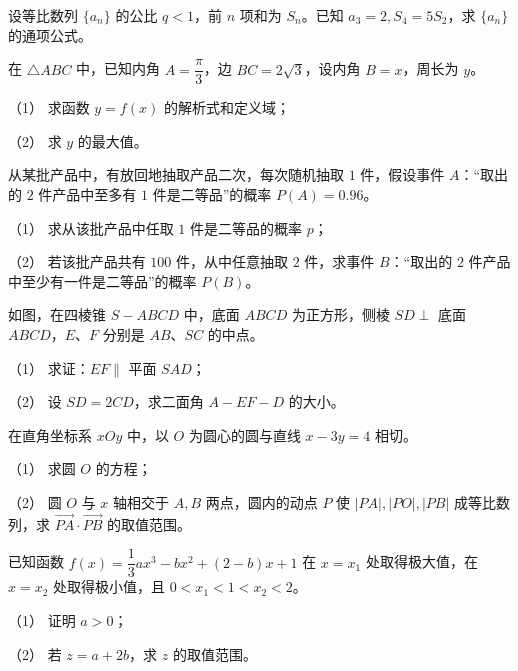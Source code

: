 \begin{question}
设等比数列 $\{a_n\}$ 的公比 $q<1$，前 $n$ 项和为 $S_n$。已知 $a_3=2,S_4=5S_2$，求 $\{a_n\}$ 的通项公式。

\end{question}
\begin{question}
在 $\triangle ABC$ 中，已知内角 $A=\dfrac\pi3$，边 $BC=2\sqrt3$，设内角 $B=x$，周长为 $y$。

（1） 求函数 $y=f(x)$ 的解析式和定义域；

（2） 求 $y$ 的最大值。

\end{question}
\begin{question}
从某批产品中，有放回地抽取产品二次，每次随机抽取 $1$ 件，假设事件 $A$：“取出的 $2$ 件产品中至多有 $1$ 件是二等品”的概率 $P(A)=0.96$。

（1） 求从该批产品中任取 $1$ 件是二等品的概率 $p$；

（2） 若该批产品共有 $100$ 件，从中任意抽取 $2$ 件，求事件 $B$：“取出的 $2$ 件产品中至少有一件是二等品”的概率 $P(B)$。

\Needspace{0.4\textheight}
\end{question}
\begin{question}
如图，在四棱锥 $S-ABCD$ 中，底面 $ABCD$ 为正方形，侧棱 $SD\perp$ 底面 $ABCD$，$E\text{、}F$ 分别是 $AB\text{、}SC$ 的中点。
\nopagebreak[4]
\begin{center}\end{center}
\nopagebreak[4]
（1） 求证：$EF\parallel$ 平面 $SAD$；

（2） 设 $SD=2CD$，求二面角 $A-EF-D$ 的大小。

\end{question}
\begin{question}
在直角坐标系 $xOy$ 中，以 $O$ 为圆心的圆与直线 $x-3y=4$ 相切。

（1） 求圆 $O$ 的方程；

（2） 圆 $O$ 与 $x$ 轴相交于 $A,B$ 两点，圆内的动点 $P$ 使 $|PA|,|PO|,|PB|$ 成等比数列，求 $\overrightarrow{PA}\cdot\overrightarrow{PB}$ 的取值范围。

\end{question}
\begin{question}
已知函数 $f(x)=\dfrac13 ax^3-bx^2+(2-b)x+1$ 在 $x=x_1$ 处取得极大值，在 $x=x_2$ 处取得极小值，且 $0<x_1<1<x_2<2$。

（1） 证明 $a>0$；

（2） 若 $z=a+2b$，求 $z$ 的取值范围。

\end{question}